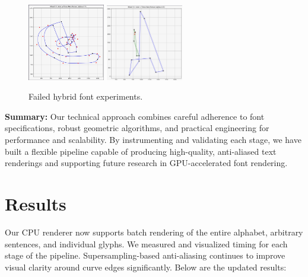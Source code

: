 \documentclass[11pt]{article}
\begin{document}
\begin{figure}[h]
    \centering
    \includegraphics[width=0.3\textwidth]{../images/hybridFontAttempt.jpeg}
    \includegraphics[width=0.3\textwidth]{../images/hybridFont2.jpeg}
    \caption{Failed hybrid font experiments.}
    \label{fig:hybrid_attempt}
\end{figure}
\par

\textbf{Summary:} Our technical approach combines careful adherence to font specifications, robust geometric algorithms, and practical engineering for performance and scalability. By instrumenting and validating each stage, we have built a flexible pipeline capable of producing high-quality, anti-aliased text renderings and supporting future research in GPU-accelerated font rendering. \\

\section{Results}
Our CPU renderer now supports batch rendering of the entire alphabet, arbitrary sentences, and individual glyphs. We measured and visualized timing for each stage of the pipeline. Supersampling-based anti-aliasing continues to improve visual clarity around curve edges significantly. Below are the updated results: \\
\end{document}
